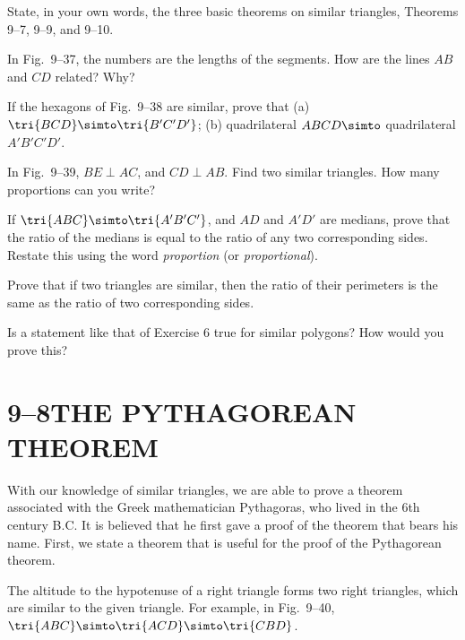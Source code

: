 \documentclass[11pt]{book}
\theoremstyle{bkplain}
\theoremstyle{XIplainnote}
\theoremstyle{bkplain}
\theoremstyle{bkplain}
\begin{document}
\begin{exercisecols}
\begin{exlist}
\item State, in your own words, the three basic theorems on similar triangles,
      Theorems 9--7, 9--9, and 9--10.
\item In Fig.~9--37, the numbers are the lengths of the segments. How are the
      lines $AB$ and $CD$ related? Why?
\exfig{\FIGIXTHIRTYSEVEN}
\item If the hexagons of Fig.~9--38 are similar, prove that (a) $\tri{BCD} \simto
      \tri{B'C'D'}$; (b) quadrilateral $ABCD \simto$ quadrilateral $A'B'C'D'$.
\exfig{\FIGIXTHIRTYEIGHT}
\item In Fig.~9--39, $BE \perp AC$, and $CD \perp AB$. Find two similar
      triangles. How many proportions can you write?
\exfig{\FIGIXTHIRTYNINE}
\item If $\tri{ABC} \simto \tri{A'B'C'}$, and $AD$ and $A'D'$ are medians, prove
      that the ratio of the medians is equal to the ratio of any two
      corresponding sides. Restate this using the word \emph{proportion} (or
      \emph{proportional}).
\item Prove that if two triangles are similar, then the ratio of their perimeters
      is the same as the ratio of two corresponding sides.
\item Is a statement like that of Exercise 6 true for similar polygons? How would
      you prove this?
\end{exlist}
\end{exercisecols}

\section*{9--8\quad THE PYTHAGOREAN THEOREM}

With our knowledge of similar triangles, we are able to prove a theorem
associated with the Greek mathematician Pythagoras, who lived in the 6th century
B.C. It is believed that he first gave a proof of the theorem that bears his
name. First, we state a theorem that is useful for the proof of the Pythagorean
theorem.

\begin{theorem}
The altitude to the hypotenuse of a right triangle forms two right triangles,
which are similar to the given triangle. For example, in Fig.~9--40,
$\tri{ABC} \simto \tri{ACD} \simto \tri{CBD}$.
\end{theorem}
\end{document}

